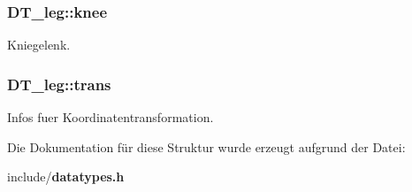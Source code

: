 \subsubsection[{knee}]{ {\bf DT\_\-leg::knee}}\label{struct_d_t__leg_a1a8b39303b9f2c818a89ad38d1d5af4c}
Kniegelenk. 
\subsubsection[{trans}]{ {\bf DT\_\-leg::trans}}\label{struct_d_t__leg_a6b62559aa3614ddb58771112d1c744e1}
Infos fuer Koordinatentransformation. 

Die Dokumentation für diese Struktur wurde erzeugt aufgrund der Datei:\begin{DoxyCompactItemize}
\item 
include/{\bf datatypes.h}\end{DoxyCompactItemize}
